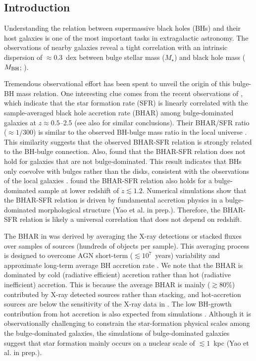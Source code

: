 \documentclass[twocolumn,twocolappendix,times]{aastex63}
\newcommand{\mstar}{M_{\star}} %
\newcommand{\mbh}{M_{\rm BH}}
\newcommand{\cjp}[2]{\textcolor{red}{#1}}
\newcommand{\fst}[1]{#1}
\begin{document}
\begin{CJK*}{UTF8}{gbsn}

\section{Introduction}
\label{sec:intro}

Understanding the relation between supermassive black holes (BHs)
and their host galaxies is one of the most important tasks 
in extragalactic astronomy. 
The observations of nearby galaxies reveal a tight correlation 
with an intrinsic dispersion of $\approx 0.3$~dex
between bulge stellar mass ($\mstar$) and black hole mass 
($\mbh$; \citealt{kormendy13, saglia16}).

Tremendous observational effort has been spent to unveil 
the origin of this bulge-BH mass relation. 
One interesting clue comes from the recent observations of \cite{yang19}, which indicate that the
star formation rate (SFR) is linearly correlated with the
sample-averaged black hole accretion rate (BHAR)
among bulge-dominated galaxies at $z \approx 0.5$--2.5 (see also \citealt{kocevski17, ni19, ni21} for similar conclusions).
Their BHAR/SFR ratio ($\approx 1/300$) is similar to the observed BH-bulge mass ratio in the local universe \citep{kormendy13}.
This similarity suggests that the observed BHAR-SFR relation is strongly related to the BH-bulge connection.
Also, \cite{yang19} found that the BHAR-SFR relation does not hold for galaxies that are not bulge-dominated. 
This result indicates that BHs only coevolve with bulges rather than the disks, consistent with the observations of the local galaxies \citep{kormendy13}.
\cite{ni21} found the BHAR-SFR relation also holds for a bulge-dominated sample at lower redshift of $z \lesssim 1.2$.
Numerical simulations show that the BHAR-SFR relation is driven by fundamental accretion physics in a bulge-dominated morphological structure (Yao et al. in prep.). 
Therefore, the BHAR-SFR relation is likely a universal correlation that does not depend on redshift. 

\fst{The BHAR in \cite{yang19} was derived by averaging the X-ray detections or stacked fluxes over samples of sources (hundreds of objects per sample).
This averaging process is designed to overcome AGN short-term ($\lesssim 10^7$~years) variability and approximate long-term average BH accretion rate \citep[e.g.,][]{hickox14, yang17, yuan_f18}. 
We note that the \cite{yang19} BHAR is dominated by cold (radiative efficient) accretion rather than hot (radiative inefficient) accretion.  
This is because the average BHAR is mainly ($\gtrsim 80\%$) contributed by X-ray detected sources rather than stacking, and hot-accretion sources are below the sensitivity of the X-ray data in \cite{yang19}. 
The low BH-growth contribution from hot accretion is also expected from simulations \citep[e.g.,][]{croton06, yuan_f18}. 
Although it is observationally challenging to constrain the star-formation physical scales among the bulge-dominated galaxies, 
the simulations of bulge-dominated galaxies suggest that star formation mainly occurs on a nuclear scale of $\lesssim 1$~kpc (Yao et al. in prep.).
}


\end{CJK*}
\end{document}
